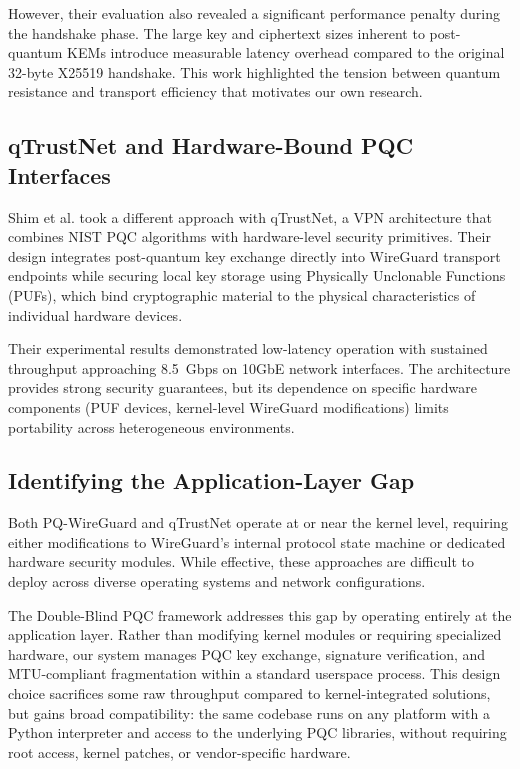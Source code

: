 \documentclass[10pt, conference, letterpaper]{IEEEtran}
\begin{document}
However, their evaluation also revealed a significant performance penalty during the handshake phase. The large key and ciphertext sizes inherent to post-quantum KEMs introduce measurable latency overhead compared to the original 32-byte X25519 handshake. This work highlighted the tension between quantum resistance and transport efficiency that motivates our own research.

\subsection{qTrustNet and Hardware-Bound PQC Interfaces}
Shim et al. \cite{shim2025qtrustnet} took a different approach with qTrustNet, a VPN architecture that combines NIST PQC algorithms with hardware-level security primitives. Their design integrates post-quantum key exchange directly into WireGuard transport endpoints while securing local key storage using Physically Unclonable Functions (PUFs), which bind cryptographic material to the physical characteristics of individual hardware devices.

Their experimental results demonstrated low-latency operation with sustained throughput approaching 8.5~Gbps on 10GbE network interfaces. The architecture provides strong security guarantees, but its dependence on specific hardware components (PUF devices, kernel-level WireGuard modifications) limits portability across heterogeneous environments.

\subsection{Identifying the Application-Layer Gap}
Both PQ-WireGuard and qTrustNet operate at or near the kernel level, requiring either modifications to WireGuard's internal protocol state machine or dedicated hardware security modules. While effective, these approaches are difficult to deploy across diverse operating systems and network configurations.

The Double-Blind PQC framework addresses this gap by operating entirely at the application layer. Rather than modifying kernel modules or requiring specialized hardware, our system manages PQC key exchange, signature verification, and MTU-compliant fragmentation within a standard userspace process. This design choice sacrifices some raw throughput compared to kernel-integrated solutions, but gains broad compatibility: the same codebase runs on any platform with a Python interpreter and access to the underlying PQC libraries, without requiring root access, kernel patches, or vendor-specific hardware.
\end{document}
